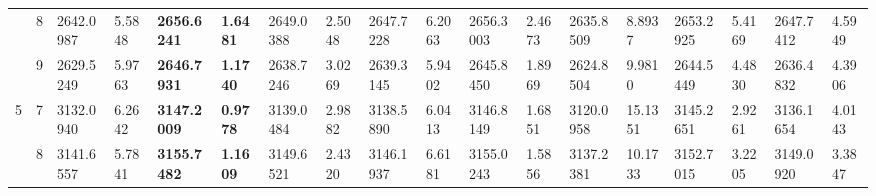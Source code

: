 \documentclass[conference]{IEEEtran}
\begin{document}
\begin{table*}[]
\begin{tabular}{|cc|ll|ll|ll|ll|ll|ll|ll|ll|}
		\multicolumn{1}{|c|}{}                            & 8                               & \multicolumn{1}{l|}{2642.0987}         & 5.5848                            & \multicolumn{1}{l|}{\textbf{2656.6241}} & \textbf{1.6481}                   & \multicolumn{1}{l|}{2649.0388}         & 2.5048                            & \multicolumn{1}{l|}{2647.7228}         & 6.2063                            & \multicolumn{1}{l|}{2656.3003}          & 2.4673                            & \multicolumn{1}{l|}{2635.8509}         & 8.8937                            & \multicolumn{1}{l|}{2653.2925}         & 5.4169                            & \multicolumn{1}{l|}{2647.7412}         & 4.5949                            \\ \cline{2-18} 
		\multicolumn{1}{|c|}{}                            & 9                               & \multicolumn{1}{l|}{2629.5249}         & 5.9763                            & \multicolumn{1}{l|}{\textbf{2646.7931}} & \textbf{1.1740}                   & \multicolumn{1}{l|}{2638.7246}         & 3.0269                            & \multicolumn{1}{l|}{2639.3145}         & 5.9402                            & \multicolumn{1}{l|}{2645.8450}          & 1.8969                            & \multicolumn{1}{l|}{2624.8504}         & 9.9810                            & \multicolumn{1}{l|}{2644.5449}         & 4.4830                            & \multicolumn{1}{l|}{2636.4832}         & 4.3906                            \\ \hline
		\multicolumn{1}{|c|}{\multirow{3}{*}{5}}          & 7                               & \multicolumn{1}{l|}{3132.0940}         & 6.2642                            & \multicolumn{1}{l|}{\textbf{3147.2009}} & \textbf{0.9778}                   & \multicolumn{1}{l|}{3139.0484}         & 2.9882                            & \multicolumn{1}{l|}{3138.5890}         & 6.0413                            & \multicolumn{1}{l|}{3146.8149}          & 1.6851                            & \multicolumn{1}{l|}{3120.0958}         & 15.1351                           & \multicolumn{1}{l|}{3145.2651}         & 2.9261                            & \multicolumn{1}{l|}{3136.1654}         & 4.0143                            \\ \cline{2-18} 
		\multicolumn{1}{|c|}{}                            & 8                               & \multicolumn{1}{l|}{3141.6557}         & 5.7841                            & \multicolumn{1}{l|}{\textbf{3155.7482}} & \textbf{1.1609}                   & \multicolumn{1}{l|}{3149.6521}         & 2.4320                            & \multicolumn{1}{l|}{3146.1937}         & 6.6181                            & \multicolumn{1}{l|}{3155.0243}          & 1.5856                            & \multicolumn{1}{l|}{3137.2381}         & 10.1733                           & \multicolumn{1}{l|}{3152.7015}         & 3.2205                            & \multicolumn{1}{l|}{3149.0920}         & 3.3847                            \\ \cline{2-18} 

\end{tabular}
\end{table*}
\end{document}
